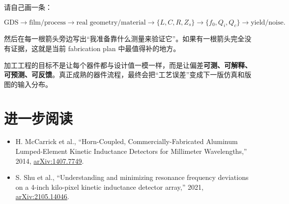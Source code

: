 请自己画一条：

\[
\text{GDS}
\rightarrow
\text{film/process}
\rightarrow
\text{real geometry/material}
\rightarrow
\{L,C,R,Z_s\}
\rightarrow
\{f_0,Q_i,Q_c\}
\rightarrow
\text{yield/noise}.
\]

然后在每一根箭头旁边写出“我准备靠什么测量来验证它”。如果有一根箭头完全没有证据，这就是当前 fabrication plan 中最值得补的地方。

\begin{checkpointbox}
加工工程的目标不是让每个器件都与设计值一模一样，而是让偏差\textbf{可测、可解释、可预测、可反馈}。真正成熟的器件流程，最终会把“工艺误差”变成下一版仿真和版图的输入分布。
\end{checkpointbox}

\section*{进一步阅读}

\begin{itemize}
  \item H. McCarrick et al., ``Horn-Coupled, Commercially-Fabricated Aluminum Lumped-Element Kinetic Inductance Detectors for Millimeter Wavelengths,'' 2014, \href{https://arxiv.org/abs/1407.7749}{arXiv:1407.7749}.
  \item S. Shu et al., ``Understanding and minimizing resonance frequency deviations on a 4-inch kilo-pixel kinetic inductance detector array,'' 2021, \href{https://arxiv.org/abs/2105.14046}{arXiv:2105.14046}.
\end{itemize}
